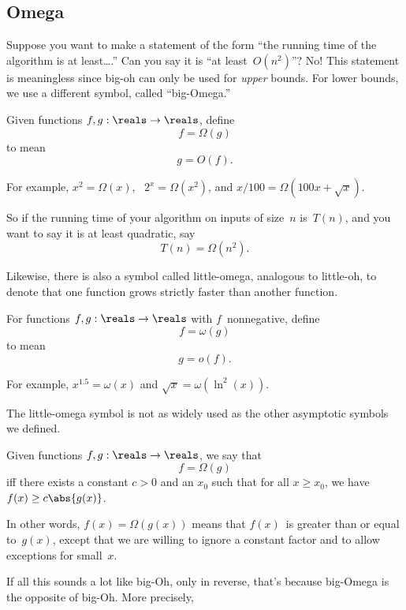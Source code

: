 \subsection{Omega}\label{omega_subsec}

Suppose you want to make a statement of the form ``the running time of
the algorithm is at least\dots.''  Can you say it is ``at
least~$O(n^2)$''?  No!  This statement is meaningless since big-oh can
only be used for \emph{upper} bounds.  For lower bounds, we use a
different symbol, called ``big-Omega.''
\begin{definition}\label{def:Omega}
Given functions $f, g : \reals \to \reals$, define
\[
    f = \Omega(g)
\]
to mean
\[
g = O(f).
\]
\end{definition}
For example, $x^2 = \Omega(x)$, \ $2^x = \Omega(x^2)$, and $x/100 =
\Omega(100 x + \sqrt{x})$.

So if the running time of your algorithm on inputs of size~$n$
is~$T(n)$, and you want to say it is at least quadratic, say
\[
    T(n) = \Omega(n^2).
\]

Likewise, there is also a symbol called little-omega, analogous to
little-oh, to denote that one function grows strictly faster than
another function.

\begin{definition}\label{def:omega}
For functions $f, g: \reals \to \reals$ with $f$~nonnegative, define
\[
    f = \omega(g)
\]
to mean
\[
g = o(f).
\]
\end{definition}

For example, $x^{1.5} = \omega(x)$ and $\sqrt{x} = \omega(\ln^2(x))$.

The little-omega symbol is not as widely used as the other asymptotic
symbols we defined.


\iffalse

\begin{definition}\label{def:Omega}
Given functions $f, g : \reals \to \reals$, we say that
\[
    f = \Omega(g)
\]
iff there exists a constant $c > 0$ and an $x_0$ such that for all $x
\ge x_0$, we have $f(x) \ge c \abs{g(x)}$.
\end{definition}

In other words, $f(x) = \Omega(g(x))$ means that $f(x)$~is greater
than or equal to~$g(x)$, except that we are willing to ignore a
constant factor and to allow exceptions for small~$x$.

If all this sounds a lot like big-Oh, only in reverse, that's because
big-Omega is the opposite of big-Oh.  More precisely,

